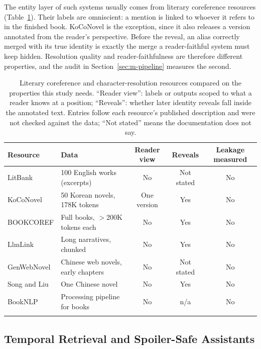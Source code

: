 \documentclass[sn-mathphys]{sn-jnl}%
\theoremstyle{thmstyleone}%
\theoremstyle{thmstyletwo}%
\theoremstyle{thmstylethree}%
\begin{document}
The entity layer of such systems usually comes from literary coreference resources (Table~\ref{tab:rw}). Their labels are omniscient: a mention is linked to whoever it refers to in the finished book. KoCoNovel \cite{kim2024koconovel} is the exception, since it also releases a version annotated from the reader's perspective. Before the reveal, an alias correctly merged with its true identity is exactly the merge a reader-faithful system must keep hidden. Resolution quality and reader-faithfulness are therefore different properties, and the audit in Section~\ref{sec:m-pipeline} measures the second.

\begin{table}[!t]
\caption{Literary coreference and character-resolution resources compared on the properties this study needs. ``Reader view'': labels or outputs scoped to what a reader knows at a position; ``Reveals'': whether later identity reveals fall inside the annotated text. Entries follow each resource's published description and were not checked against the data; ``Not stated'' means the documentation does not say.}\label{tab:rw}
\footnotesize
\begin{tabular*}{\textwidth}{@{\extracolsep\fill}llccc}
\toprule
Resource & Data & Reader view & Reveals & Leakage measured \\
\midrule
LitBank \cite{bamman2020litbank} & 100 English works (excerpts) & No & Not stated & No \\
KoCoNovel \cite{kim2024koconovel} & 50 Korean novels, 178K tokens & One version & Yes & No \\
BOOKCOREF \cite{martinelli2025bookcoref} & Full books, $>$200K tokens each & No & Yes & No \\
LlmLink \cite{zhu2025llmlink} & Long narratives, chunked & No & Yes & No \\
GenWebNovel \cite{zhao2025genwebnovel} & Chinese web novels, early chapters & No & Not stated & No \\
Song and Liu \cite{song2024approaches} & One Chinese novel & No & Yes & No \\
BookNLP \cite{booknlp} & Processing pipeline for books & No & n/a & No \\
\botrule
\end{tabular*}
\end{table}

\subsection{Temporal Retrieval and Spoiler-Safe Assistants}\label{sec:rw-spoiler}
\end{document}
